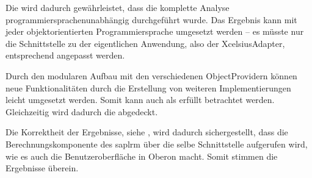\begin{onehalfspacing}
Die  wird dadurch gewährleistet, dass die komplette Analyse programmiersprachenunabhängig durchgeführt wurde. Das Ergebnis kann mit jeder objektorientierten Programmiersprache umgesetzt werden -- es müsste nur die Schnittstelle zu der eigentlichen Anwendung, also der Xcel\-si\-us\-Adap\-ter, entsprechend angepasst werden.



Durch den modularen Aufbau mit den verschiedenen ObjectProvidern können neue Funktionalitäten durch die Erstellung von weiteren Implementierungen leicht umgesetzt werden. Somit kann auch  als erfüllt betrachtet werden. Gleichzeitig wird dadurch die  abgedeckt.

Die Korrektheit der Ergebnisse, siehe , wird dadurch sichergestellt, dass die Berechnungskomponente des \gls{saplrm} über die selbe Schnittstelle aufgerufen wird, wie es auch die Benutzeroberfläche in Oberon macht. Somit stimmen die Ergebnisse überein.


\end{onehalfspacing}
